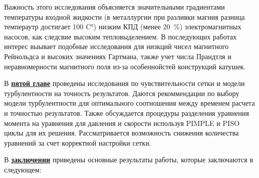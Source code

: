 Важность этого исследования объясняется значительными градиентами температуры входной жидкости (в металлургии при разливки магния разница темпераутр достигает 100 C\si{\degree}) низким КПД (менее 20~\%) электромагнитных насосов, как следсвие высоким тепловыделением. В последующих работах интерес выывает подобные исследования для низкций чисел магнитного Рейнольдса и высоких значениях Гартмана, также учет числа Прандтля и неравномерности магнитного поля из-за особеннойстей конструкций катушек. 


В \underline{\textbf{пятой главе}} проведены исследования по чувствительности сетки и модели турбулентности на точность результатов. Даются рекоммендации по выбору модели турбулентности для оптимального соотношения между временем расчета и точностью результатов. Также обсуждается процедуры разделения уравнения момента на уравнения для давления и скорости используя PIMPLE и PISO циклы для их решения. Рассматривается возможность снижения количества уравнений за счет корректной настройки сетки. 


\FloatBarrier
{}                                  %
В \underline{\textbf{заключении}} приведены основные результаты работы, которые заключаются в следующем:



